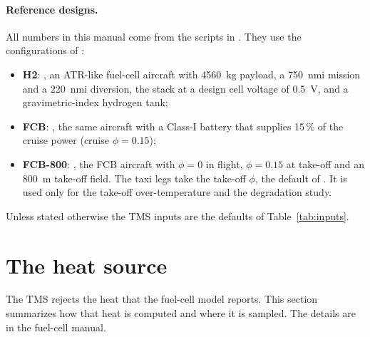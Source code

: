 \documentclass[a4paper,11pt]{article}
\begin{document}
\paragraph{Reference designs.} All numbers in this manual come from the scripts in
. They use the configurations of
:
\begin{itemize}
\item \textbf{H2}: , an ATR-like fuel-cell aircraft with
  \SI{4560}{kg} payload, a \SI{750}{nmi} mission and a \SI{220}{nmi} diversion, the
   stack at a design cell voltage of \SI{0.5}{V}, and a
  gravimetric-index hydrogen tank;
\item \textbf{FCB}: , the same aircraft with a Class-I
  battery that supplies 15\,\% of the cruise power (cruise $\phi = 0.15$);
\item \textbf{FCB-800}: ,
  the FCB aircraft with $\phi = 0$ in flight, $\phi = 0.15$ at take-off and an
  \SI{800}{m} take-off field. The taxi legs take the take-off $\phi$, the default of
  . It is used only for the take-off over-temperature and the
  degradation study.
\end{itemize}
Unless stated otherwise the TMS inputs are the defaults of Table~\ref{tab:inputs}.

\section{The heat source}\label{sec:heat-source}

The TMS rejects the heat that the fuel-cell model reports. This section summarizes how
that heat is computed and where it is sampled. The details are in the fuel-cell manual.
\end{document}
